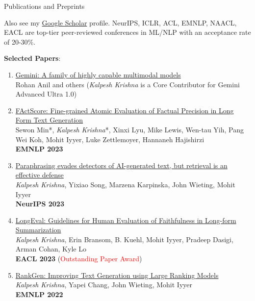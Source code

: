 \documentclass{resume} %
\begin{document}
\begin{rSection}{Publications and Preprints}
\vspace*{0.1in}

Also see my \href{https://scholar.google.com/citations?hl=en&user=9g2BsMUAAAAJ}{Google Scholar} profile. NeurIPS, ICLR, ACL, EMNLP, NAACL, EACL are top-tier peer-reviewed conferences in ML/NLP with an acceptance rate of  20-30\%.
\vspace{0.05in}

\textbf{Selected Papers}:
\begin{enumerate}[leftmargin=*]
\setlength\itemsep{0.4em}

\item \href{https://storage.googleapis.com/deepmind-media/gemini/gemini_1_report.pdf}{Gemini: A family of highly capable multimodal models} \\
Rohan Anil and others (\emph{Kalpesh Krishna} is a Core Contributor for Gemini Advanced Ultra 1.0)

\item \href{https://arxiv.org/abs/2305.14251}{FActScore: Fine-grained Atomic Evaluation of Factual Precision in Long Form Text Generation} \\
Sewon Min*, \emph{Kalpesh Krishna}*, Xinxi Lyu, Mike Lewis, Wen-tau Yih, Pang Wei Koh, Mohit Iyyer, Luke Zettlemoyer, Hannaneh Hajishirzi \\
\textbf{EMNLP 2023}

\item \href{https://arxiv.org/abs/2303.13408}{Paraphrasing evades detectors of AI-generated text, but retrieval is an effective defense} \\
\textit{Kalpesh Krishna}, Yixiao Song, Marzena Karpinska, John Wieting, Mohit Iyyer \\
\textbf{NeurIPS 2023}

\item \href{https://arxiv.org/abs/2301.13298}{LongEval: Guidelines for Human Evaluation of Faithfulness in Long-form Summarization} \\
\textit{Kalpesh Krishna}, Erin Bransom, B. Kuehl, Mohit Iyyer, Pradeep Dasigi, Arman Cohan, Kyle Lo \\
\textbf{EACL 2023} (\textcolor{red}{Outstanding Paper Award})

\item \href{https://arxiv.org/abs/2205.09726}{RankGen: Improving Text Generation using Large Ranking Models} \\
\textit{Kalpesh Krishna}, Yapei Chang, John Wieting, Mohit Iyyer \\
\textbf{EMNLP 2022}



\end{enumerate}
\end{rSection}
\end{document}
